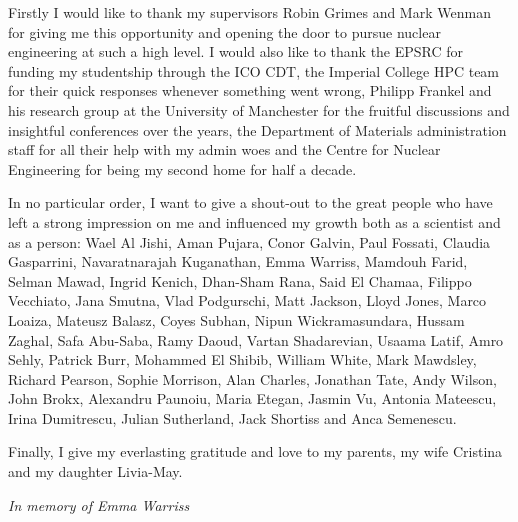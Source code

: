 \cleardoublepage


\begin{acknowledgements}

Firstly I would like to thank my supervisors Robin Grimes and Mark Wenman for giving me this opportunity and opening the door to pursue nuclear engineering at such a high level. I would also like to thank the EPSRC for funding my studentship through the ICO CDT, the Imperial College HPC team for their quick responses whenever something went wrong, Philipp Frankel and his research group at the University of Manchester for the fruitful discussions and insightful conferences over the years, the Department of Materials administration staff for all their help with my admin woes and the Centre for Nuclear Engineering for being my second home for half a decade.

In no particular order, I want to give a shout-out to the great people who have left a strong impression on me and influenced my growth both as a scientist and as a person: Wael Al Jishi, Aman Pujara, Conor Galvin, Paul Fossati, Claudia Gasparrini, Navaratnarajah Kuganathan, Emma Warriss, Mamdouh Farid, Selman Mawad, Ingrid Kenich, Dhan-Sham Rana, Said El Chamaa, Filippo Vecchiato, Jana Smutna, Vlad Podgurschi, Matt Jackson, Lloyd Jones, Marco Loaiza, Mateusz Balasz, Coyes Subhan, Nipun Wickramasundara, Hussam Zaghal, Safa Abu-Saba, Ramy Daoud, Vartan Shadarevian, Usaama Latif, Amro Sehly, Patrick Burr, Mohammed El Shibib, William White, Mark Mawdsley, Richard Pearson, Sophie Morrison, Alan Charles, Jonathan Tate, Andy Wilson, John Brokx, Alexandru Paunoiu, Maria Etegan, Jasmin Vu, Antonia Mateescu, Irina Dumitrescu, Julian Sutherland, Jack Shortiss and Anca Semenescu. 

Finally, I give my everlasting gratitude and love to my parents, my wife Cristina and my daughter Livia-May.

\clearpage

\begin{center}
\emph{In memory of Emma Warriss}
\end{center}

\end{acknowledgements}
